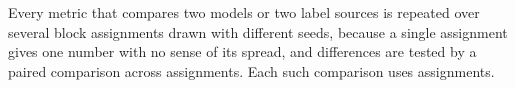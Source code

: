Every metric that compares two models or two label sources is repeated over several block assignments drawn with different seeds, because a single assignment gives one number with no sense of its spread, and differences are tested by a paired comparison across assignments. Each such comparison uses \RRBenchSeeds{} assignments.

